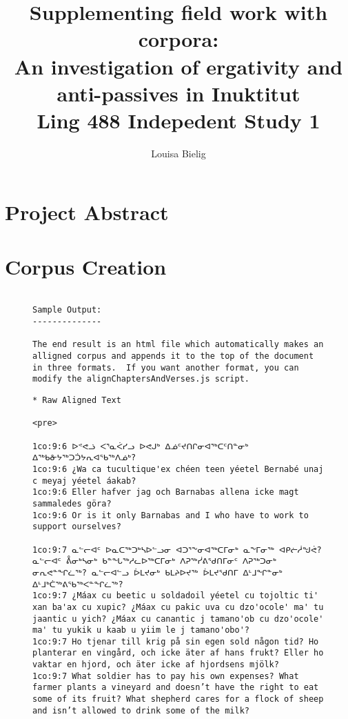 \documentclass[12pt]{article}
\title{Supplementing field work with corpora:\\ \vspace{2 mm} {\large An investigation of ergativity and anti-passives in Inuktitut\\ Ling 488 Indepedent Study 1}}
\author{Louisa Bielig}
\date{}
\begin{document}
\maketitle{} 

\tableofcontents

\section {Project Abstract}

\appendix

\section{Corpus Creation}





\begin{figure}
\begin{verbatim}

Sample Output:
--------------

The end result is an html file which automatically makes an alligned corpus and appends it to the top of the document in three formats.  If you want another format, you can modify the alignChaptersAndVerses.js script.
\end{verbatim}
\end{figure}

\begin{figure}
\begin{verbatim}
* Raw Aligned Text

<pre>

1co:9:6 ᐅᕝᕙᓘ ᐸᕐᓇᐹᓯᓗ ᐅᕙᒍᒃ ᐃᓅᑦᔪᑎᒋᓂᐊᖅᑕᑦᑎᓐᓂᒃ ᐃᖅᑲᓁᔭᖅᑐᑑᔭᕆᐊᖃᖅᐱᓅᒃ? 
1co:9:6 ¿Wa ca tucultique'ex chéen teen yéetel Bernabé unaj c meyaj yéetel áakab? 
1co:9:6 Eller hafver jag och Barnabas allena icke magt sammaledes göra? 
1co:9:6 Or is it only Barnabas and I who have to work to support ourselves?

1co:9:7 ᓇᓪᓕᐊᑦ ᐅᓇᑕᖅᑐᒃᓴᐅᓪᓗᓂ ᐊᑐᕐᖕᓂᐊᖅᑕᒥᓂᒃ ᓇᖕᒥᓂᖅ ᐊᑭᓖᓲᖑᕚ? ᓇᓪᓕᐊᑦ ᕔᓂᒃᓴᓂᒃ ᑲᓐᖓᖅᓱᓚᐅᖅᑕᒥᓂᒃ ᐱᕈᖅᓰᕕᖁᑎᒥᓂᑦ ᐱᕈᖅᑐᓂᒃ ᓂᕆᕙᓐᖏᓛᖅ? ᓇᓪᓕᐊᓪᓗ ᐆᒪᔪᓂᒃ ᑲᒪᔨᐅᔪᖅ ᐆᒪᔪᖁᑎᒥ ᐃᒻᒧᖏᓐᓂᒃ ᐃᒻᒧᒃᑖᖅᕕᖃᖅᐸᓐᖏᓛᖅ?
1co:9:7 ¿Máax cu beetic u soldadoil yéetel cu tojoltic ti' xan ba'ax cu xupic? ¿Máax cu pakic uva cu dzo'ocole' ma' tu jaantic u yich? ¿Máax cu canantic j tamano'ob cu dzo'ocole' ma' tu yukik u kaab u yiim le j tamano'obo'? 
1co:9:7 Ho tjenar till krig på sin egen sold någon tid? Ho planterar en vingård, och icke äter af hans frukt? Eller ho vaktar en hjord, och äter icke af hjordsens mjölk? 
1co:9:7 What soldier has to pay his own expenses? What farmer plants a vineyard and doesn’t have the right to eat some of its fruit? What shepherd cares for a flock of sheep and isn’t allowed to drink some of the milk? 

\end{verbatim}
\end{figure}
\end{document}
